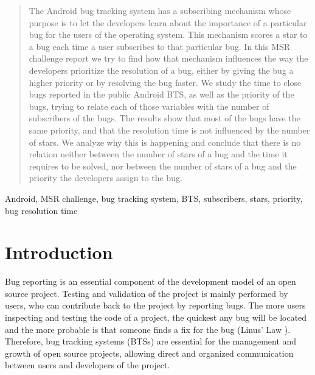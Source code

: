 \documentclass[10pt, conference, compsocconf]{IEEEtran}
\begin{document}
\begin{abstract}
The Android bug tracking system has a subscribing mechanism whose
purpose is to let the developers learn about the importance of a
particular bug for the users of the operating system. This mechanism
scores a star to a bug each time a user subscribes to that particular
bug. In this MSR challenge report we try to find how that mechanism
influences the way the developers prioritize the resolution of a bug,
either by giving the bug a higher priority or by resolving the bug
faster. We study the time to close bugs reported in the public Android
BTS, as well as the priority of the bugs, trying to relate each of
those variables with the number of subscribers of the bugs. The
results show that most of the bugs have the same priority, and that
the resolution time is not influenced by the number of stars. We
analyze why this is happening and conclude that there is no relation
neither between the number of stars of a bug and the time it requires to be solved, nor between the number of stars of a bug and the priority the developers assign to the bug.
\end{abstract}

\begin{IEEEkeywords}
Android, MSR challenge, bug tracking system, BTS, subscribers, stars, priority, bug resolution time
\end{IEEEkeywords}


%
\IEEEpeerreviewmaketitle



\section{Introduction}
Bug reporting is an essential component of the development model of an open source project. Testing and validation of the project is mainly performed by users, who can contribute back to the project by reporting bugs. The more users inspecting and testing the code of a project, the quickest any bug will be located and the more probable is that someone finds a fix for the bug (Linus' Law \cite{CathedralBazaar}). Therefore, bug tracking systems (BTSs) are essential for the management and growth of open source projects, allowing direct and organized communication between users and developers of the project.
\end{document}
